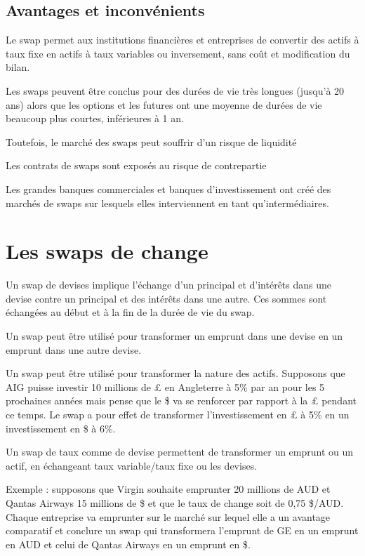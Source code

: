 	\subsection{Avantages et inconvénients}
	
	Le swap permet aux institutions financières et entreprises de convertir des actifs à taux fixe en actifs à taux variables ou inversement, sans coût et modification du bilan.

	Les swaps peuvent être conclus pour des durées de vie très longues (jusqu'à 20 ans) alors que les options et les futures ont une moyenne de durées de vie beaucoup plus courtes, inférieures à 1 an.
	
	Toutefois, le marché des swaps peut souffrir d'un risque de liquidité 
	
	Les contrats de swaps sont exposés au risque de contrepartie 

	Les grandes banques commerciales et banques d'investissement ont créé des marchés de swaps sur lesquels elles interviennent en tant qu'intermédiaires. 

\section{Les swaps de change}

Un swap de devises implique l'échange d'un principal et d'intérêts dans une devise contre un principal et des intérêts dans une autre. Ces sommes sont échangées au début et à la fin de la durée de vie du swap.

Un swap peut être utilisé pour transformer un emprunt dans une devise en un emprunt dans une autre devise. 

Un swap peut être utilisé pour transformer la nature des actifs. Supposons que AIG puisse investir 10 millions de £ en Angleterre à 5\% par an pour les 5 prochaines années mais pense que le \$ va se renforcer par rapport à la £ pendant ce temps. Le swap a pour effet de transformer l'investissement en £ à 5\% en un investissement en \$ à 6\%.

Un swap de taux comme de devise permettent de transformer un emprunt ou un actif, en échangeant taux variable/taux fixe ou les devises.


Exemple : supposons que Virgin souhaite emprunter 20 millions de AUD et Qantas Airways 15 millions de \$ et que le taux de change soit de 0,75 \$/AUD. Chaque entreprise va emprunter sur le marché sur lequel elle a un avantage comparatif et conclure un swap qui transformera l'emprunt de GE en un emprunt en AUD et celui de Qantas Airways en un emprunt en \$. 


